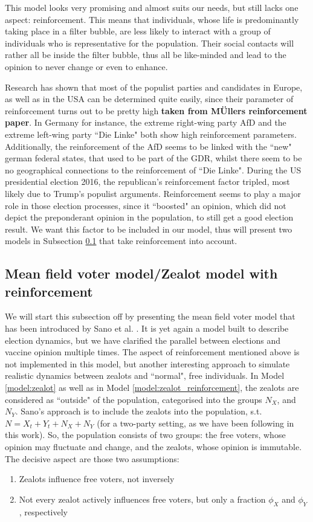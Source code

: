 \documentclass[12pt,a4paper,twoside]{article}
\begin{document}
This model looks very promising and almost suits our needs, but still lacks one aspect: reinforcement. This means that individuals, whose life is predominantly taking place in a filter bubble, are less likely to interact with a group of individuals who is representative for the population. Their social contacts will rather all be inside the filter bubble, thus all be like-minded and lead to the opinion to never change or even to enhance.

Research has shown that most of the populist parties and candidates in Europe, as well as in the USA can be determined quite easily, since their parameter of reinforcement turns out to be pretty high \textbf{taken from MÜllers reinforcement paper}. In Germany for instance, the extreme right-wing party \ac{AfD} and the extreme left-wing party ``Die Linke" both show high reinforcement parameters. Additionally, the reinforcement of the \ac{AfD} seems to be linked with the ``new" german federal states, that used to be part of the \ac{GDR}, whilst there seem to be no geographical connections to the reinforcement of ``Die Linke". During the US presidential election 2016, the republican's reinforcement factor tripled, most likely due to Trump's populist arguments.%
Reinforcement seems to play a major role in those election processes, since it ``boosted" an opinion, which did not depict the preponderant opinion in the population, to still get a good election result. We want this factor to be included in our model, thus will present two models in Subsection \ref{subsec:sano_zealot_reinforcement} that take reinforcement into account.

\subsection{Mean field voter model/Zealot model with reinforcement}\label{subsec:sano_zealot_reinforcement}
We will start this subsection off by presenting the mean field voter model that has been introduced by Sano et al. \cite{Sano07122017}. It is yet again a model built to describe election dynamics, but we have clarified the parallel between elections and vaccine opinion multiple times. The aspect of reinforcement mentioned above is not implemented in this model, but another interesting approach to simulate realistic dynamics between zealots and ``normal", free individuals. In Model \ref{model:zealot} as well as in Model \ref{model:zealot_reinforcement}, the zealots are considered as ``outside" of the population, categorised into the groups $N_X$, and $N_Y$. Sano's approach is to include the zealots into the population, s.t. $N = X_t + Y_t + N_X + N_Y$ (for a two-party setting, as we have been following in this work). So, the population consists of two groups: the free voters, whose opinion may fluctuate and change, and the zealots, whose opinion is immutable. The decisive aspect are those two assumptions:
\begin{enumerate}
	\item Zealots influence free voters, not inversely
	\item Not every zealot actively influences free voters, but only a fraction $\phi_X$ and $\phi_Y$, respectively
\end{enumerate}
\end{document}
